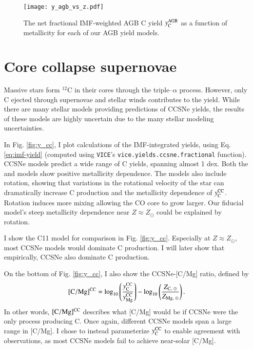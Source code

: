 \documentclass[12pt,oneside]{report}
\newcommand{\VICE}{\texttt{VICE}}
\newcommand{\Ycc}{\ensuremath{y_{\rm C}^{\rm CC}}}
\newcommand{\Yoc}{\ensuremath{y_{\rm Mg}^{\rm CC}}}
\newcommand{\Ycagb}{\ensuremath{y_{\rm C}^{\rm AGB}}}
\newcommand{\sun}{\ensuremath{\odot}}
\begin{document}
\begin{figure}
    \centering
    \texttt{[image: y\_agb\_vs\_z.pdf]}

    \caption[AGB yield metallicity dependence]{The net fractional IMF-weighted AGB C yield $\Ycagb$ as a function of metallicity for each of our AGB yield models.
    }
    \label{fig:yagb-z}
\end{figure}

\section{Core collapse supernovae}


Massive stars form $^{12}$C in their cores through the triple--$\alpha$ process. However, only C ejected through supernovae and stellar winds contributes to the yield. 
While there are many stellar models providing predictions of CCSNe yields, the results of these models are highly uncertain due to the many stellar modeling uncertainties. 

In Fig. \ref{fig:y_cc}, I plot calculations of the IMF-integrated yields, using Eq. \ref{eq:imf-yield} (computed using \VICE's \texttt{vice.yields.ccsne.fractional} function). 
CCSNe models predict a wide range of C yields, spanning almost 1 dex. 
Both the \citet{NKT13} and \cite{LC18} models show positive metallicity dependence. 
The \cite{LC18} models also include rotation, showing that variations in the rotational velocity of the star can dramatically increase C production and the metallicity dependence of $\Ycc$. Rotation induces more mixing allowing the CO core to grow larger. Our fiducial model's steep metallicity dependence near $Z\approx Z_\odot$ could be explained by rotation. 


I show the C11 model for comparison in Fig. \ref{fig:y_cc}. Especially at $Z\approx Z_\odot$, most CCSNe models would dominate C production. I will later show that empirically, CCSNe also dominate C production. 

On the bottom of Fig. \ref{fig:y_cc}, I also show the CCSNe-[C/Mg] ratio, defined by
\begin{equation}\label{eq:c_mg_cc}
    {\rm [C/Mg]^{CC}} = \log_{10}\left( \frac{\Ycc}{\Yoc}\right) - \log_{10} \left( \frac{Z_{{\rm C},\ \sun }}{Z_{{\rm Mg},\ \sun }} \right).
\end{equation}
In other words, ${\rm [C/Mg]^{CC}}$ describes what [C/Mg] would be if CCSNe were the only process producing C.
Once again, different CCSNe models span a large range in [C/Mg]. 
I chose to instead parameterize $\Ycc$ to enable agreement with observations, as most CCSNe models fail to achieve near-solar [C/Mg].
\end{document}
